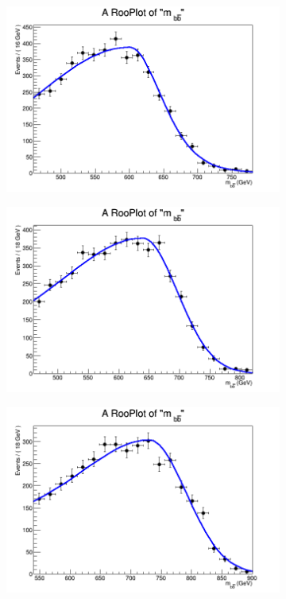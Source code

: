 \begin{figure}[phtb!]
\begin{center}
  \begin{subfigure}[$m_{A}=650$ GeV]{0.4\textwidth}\includegraphics[width=\textwidth]{FitResults/images/fitMC_bAbb650_2.png}\end{subfigure}
  \begin{subfigure}[$m_{A}=700$ GeV]{0.4\textwidth}\includegraphics[width=\textwidth]{FitResults/images/fitMC_bAbb700_2.png}\end{subfigure}
  \begin{subfigure}[$m_{A}=800$ GeV]{0.4\textwidth}\includegraphics[width=\textwidth]{FitResults/images/fitMC_bAbb800_2.png}\end{subfigure}

\end{center}
\end{figure}
